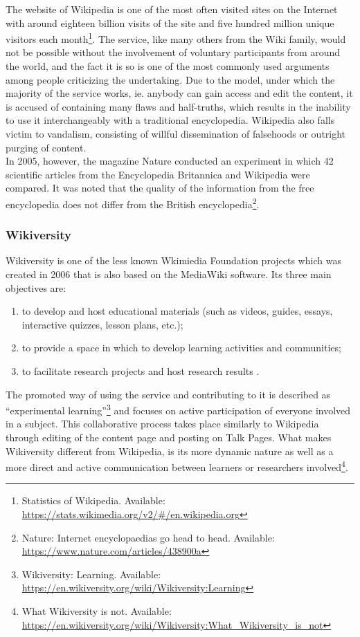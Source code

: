 \documentclass[a4paper]{article}
\begin{document}
\noindent
The website of Wikipedia is one of the most often visited sites on the Internet with around eighteen billion visits of the site and five hundred million unique visitors each month\footnote{Statistics of Wikipedia. Available: \url{https://stats.wikimedia.org/v2/#/en.wikipedia.org}}. The service, like many others from the Wiki family, would not be possible without the involvement of voluntary participants from around the world, and the fact it is so is one of the most commonly used arguments among people criticizing the undertaking. Due to the model, under which the majority of the service works, ie. anybody can gain access and edit the content, it is accused of containing many flaws and half-truths, which results in the inability to use it interchangeably with a traditional encyclopedia. Wikipedia also falls victim to vandalism, consisting of willful dissemination of falsehoods or outright purging of content. \\ 

\noindent
In 2005, however, the magazine Nature conducted an experiment in which 42 scientific articles from the Encyclopedia Britannica and Wikipedia were compared. It was noted that the quality of the information from the free encyclopedia does not differ from the British encyclopedia\footnote{Nature: Internet encyclopaedias go head to head. Available: \url{https://www.nature.com/articles/438900a}}.

\subsubsection{Wikiversity}
Wikiversity is one of the less known Wkimiedia Foundation projects which was created in 2006 that is also based on the MediaWiki software. Its three main objectives are: 
\begin{enumerate}
	\item to develop and host educational materials (such as videos, guides, essays, interactive quizzes, lesson plans, etc.);
    \item to provide a space in which to develop learning activities and communities;
    \item to facilitate research projects and host research results \cite{mw-wikiversity}.
\end{enumerate}
The promoted way of using the service and contributing to it is described as ``experimental learning''\footnote{Wikiversity: Learning. Available: \url{https://en.wikiversity.org/wiki/Wikiversity:Learning}} and focuses on active participation of everyone involved in a subject. This collaborative process takes place similarly to Wikipedia through editing of the content page and posting on Talk Pages. What makes Wikiversity different from Wikipedia, is its more dynamic nature as well as a more direct and active communication between learners or researchers involved\footnote{What Wikiversity is not. Available: \url{https://en.wikiversity.org/wiki/Wikiversity:What_Wikiversity_is_not}}.
\end{document}
